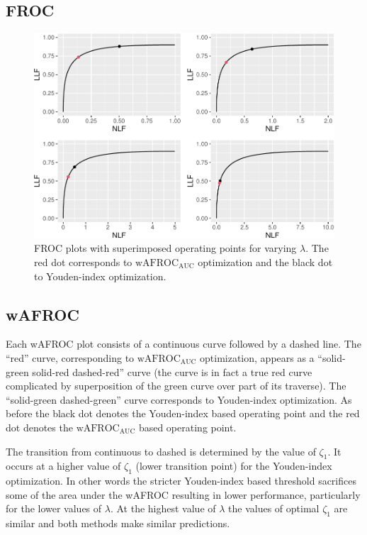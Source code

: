 \documentclass[
]{book}
\begin{document}
\hypertarget{froc-1}{%
\subsection{FROC}\label{froc-1}}

\begin{figure}
\centering
\includegraphics{21-optim-op-point_files/figure-latex/optim-op-point-vary-lambda-froc-1.pdf}
\caption{\label{fig:optim-op-point-vary-lambda-froc}FROC plots with superimposed operating points for varying \(\lambda\). The red dot corresponds to \(\text{wAFROC}_\text{AUC}\) optimization and the black dot to Youden-index optimization.}
\end{figure}

\hypertarget{wafroc-1}{%
\subsection{wAFROC}\label{wafroc-1}}

Each wAFROC plot consists of a continuous curve followed by a dashed line. The ``red'' curve, corresponding to \(\text{wAFROC}_\text{AUC}\) optimization, appears as a ``solid-green solid-red dashed-red'' curve (the curve is in fact a true red curve complicated by superposition of the green curve over part of its traverse). The ``solid-green dashed-green'' curve corresponds to Youden-index optimization. As before the black dot denotes the Youden-index based operating point and the red dot denotes the \(\text{wAFROC}_\text{AUC}\) based operating point.

The transition from continuous to dashed is determined by the value of \(\zeta_1\). It occurs at a higher value of \(\zeta_1\) (lower transition point) for the Youden-index optimization. In other words the stricter Youden-index based threshold sacrifices some of the area under the wAFROC resulting in lower performance, particularly for the lower values of \(\lambda\). At the highest value of \(\lambda\) the values of optimal \(\zeta_1\) are similar and both methods make similar predictions.
\end{document}
